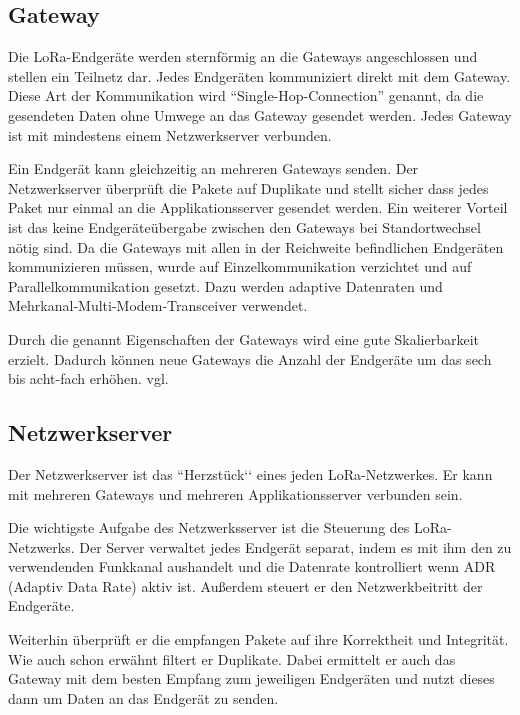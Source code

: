 \documentclass[a4paper, 12pt]{article}
\begin{document}
        
        \subsection{Gateway}
            Die LoRa-Endgeräte werden sternförmig an die Gateways angeschlossen und stellen ein Teilnetz dar. 
            Jedes Endgeräten kommuniziert direkt mit dem Gateway. Diese Art der Kommunikation wird  
            ``Single-Hop-Connection'' genannt, da die gesendeten Daten ohne Umwege an das Gateway gesendet werden. 
            Jedes Gateway ist mit mindestens einem Netzwerkserver verbunden.
        
            Ein Endgerät kann gleichzeitig an mehreren Gateways senden. Der Netzwerkserver überprüft die Pakete 
            auf Duplikate und stellt sicher dass jedes Paket nur einmal an die Applikationsserver gesendet werden.
            Ein weiterer Vorteil ist das keine Endgeräteübergabe zwischen den Gateways bei Standortwechsel nötig sind.
            Da die Gateways mit allen in der Reichweite befindlichen Endgeräten kommunizieren müssen, wurde 
            auf Einzelkommunikation verzichtet und auf Parallelkommunikation gesetzt. 
            Dazu werden adaptive Datenraten und Mehrkanal-Multi-Modem-Transceiver verwendet.
        
            Durch die genannt Eigenschaften der Gateways wird eine gute Skalierbarkeit erzielt. Dadurch können neue 
            Gateways die Anzahl der Endgeräte um das sech bis acht-fach erhöhen. vgl. \cite[S.10]{WhatIsLoRa}
        \subsection{Netzwerkserver}
            Der Netzwerkserver ist das ``Herzstück‘‘ eines jeden LoRa-Netzwerkes. Er kann mit mehreren Gateways und 
            mehreren Applikationsserver verbunden sein. 

            Die wichtigste Aufgabe des Netzwerksserver ist die Steuerung des LoRa-Netzwerks. Der Server 
            verwaltet jedes Endgerät separat, indem es mit ihm den zu verwendenden Funkkanal aushandelt und die Datenrate
             kontrolliert wenn ADR (Adaptiv Data Rate) aktiv ist. Außerdem steuert er den Netzwerkbeitritt der 
             Endgeräte.

            Weiterhin überprüft er die empfangen Pakete auf ihre Korrektheit und Integrität. Wie auch schon erwähnt 
            filtert er Duplikate.
            Dabei ermittelt er auch das Gateway mit dem besten Empfang zum jeweiligen Endgeräten und nutzt 
            dieses dann um Daten an das Endgerät zu senden.
\end{document}
